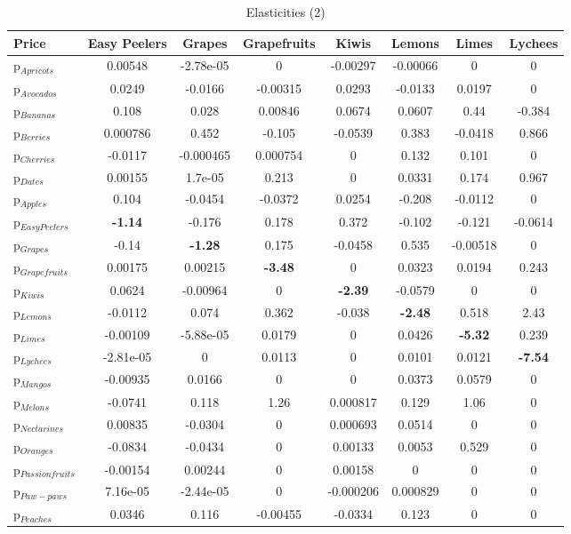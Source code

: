 \documentclass[11pt]{article}
\begin{document}
\begin{table}[h]
\caption{Elasticities (2)}
\label{table:elasticities 2}
\begin{center}
\begin{tabular}{lccccccc} \hline \hline
Price &Easy Peelers &Grapes &Grapefruits &Kiwis &Lemons &Limes &Lychees \\ \hline
p$_{Apricots}$ &0.00548 &-2.78e-05 &0 &-0.00297 &-0.00066 &0 &0 \\
p$_{Avocados}$ &0.0249 &-0.0166 &-0.00315 &0.0293 &-0.0133 &0.0197 &0 \\
p$_{Bananas}$ &0.108 &0.028 &0.00846 &0.0674 &0.0607 &0.44 &-0.384 \\
p$_{Berries}$ &0.000786 &0.452 &-0.105 &-0.0539 &0.383 &-0.0418 &0.866 \\
p$_{Cherries}$ &-0.0117 &-0.000465 &0.000754 &0 &0.132 &0.101 &0 \\
p$_{Dates}$ &0.00155 &1.7e-05 &0.213 &0 &0.0331 &0.174 &0.967 \\
p$_{Apples}$ &0.104 &-0.0454 &-0.0372 &0.0254 &-0.208 &-0.0112 &0 \\
p$_{Easy Peelers}$ &\textbf{-1.14} &-0.176 &0.178 &0.372 &-0.102 &-0.121 &-0.0614 \\
p$_{Grapes}$ &-0.14 &\textbf{-1.28} &0.175 &-0.0458 &0.535 &-0.00518 &0 \\
p$_{Grapefruits}$ &0.00175 &0.00215 &\textbf{-3.48} &0 &0.0323 &0.0194 &0.243 \\
p$_{Kiwis}$ &0.0624 &-0.00964 &0 &\textbf{-2.39} &-0.0579 &0 &0 \\
p$_{Lemons}$ &-0.0112 &0.074 &0.362 &-0.038 &\textbf{-2.48} &0.518 &2.43 \\
p$_{Limes}$ &-0.00109 &-5.88e-05 &0.0179 &0 &0.0426 &\textbf{-5.32} &0.239 \\
p$_{Lychees}$ &-2.81e-05 &0 &0.0113 &0 &0.0101 &0.0121 &\textbf{-7.54} \\
p$_{Mangos}$ &-0.00935 &0.0166 &0 &0 &0.0373 &0.0579 &0 \\
p$_{Melons}$ &-0.0741 &0.118 &1.26 &0.000817 &0.129 &1.06 &0 \\
p$_{Nectarines}$ &0.00835 &-0.0304 &0 &0.000693 &0.0514 &0 &0 \\
p$_{Oranges}$ &-0.0834 &-0.0434 &0 &0.00133 &0.0053 &0.529 &0 \\
p$_{Passion fruits}$ &-0.00154 &0.00244 &0 &0.00158 &0 &0 &0 \\
p$_{Paw-paws}$ &7.16e-05 &-2.44e-05 &0 &-0.000206 &0.000829 &0 &0 \\
p$_{Peaches}$ &0.0346 &0.116 &-0.00455 &-0.0334 &0.123 &0 &0 \\

\end{tabular}
\end{center}
\end{table}
\end{document}
